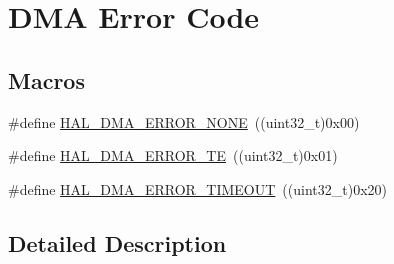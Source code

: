 \hypertarget{group___d_m_a___error___code}{\section{D\-M\-A Error Code}
\label{group___d_m_a___error___code}
}
\subsection*{Macros}
\begin{DoxyCompactItemize}
\item 
\#define \hyperlink{group___d_m_a___error___code_gaad4009390bfbe05a1bb7115d03c25a97}{H\-A\-L\-\_\-\-D\-M\-A\-\_\-\-E\-R\-R\-O\-R\-\_\-\-N\-O\-N\-E}~((uint32\-\_\-t)0x00)
\item 
\#define \hyperlink{group___d_m_a___error___code_ga9882442c5f8f0170917934bbee1cc92d}{H\-A\-L\-\_\-\-D\-M\-A\-\_\-\-E\-R\-R\-O\-R\-\_\-\-T\-E}~((uint32\-\_\-t)0x01)
\item 
\#define \hyperlink{group___d_m_a___error___code_ga6cf6a5b8881ff36ed4316a29bbfb5b79}{H\-A\-L\-\_\-\-D\-M\-A\-\_\-\-E\-R\-R\-O\-R\-\_\-\-T\-I\-M\-E\-O\-U\-T}~((uint32\-\_\-t)0x20)
\end{DoxyCompactItemize}


\subsection{Detailed Description}


